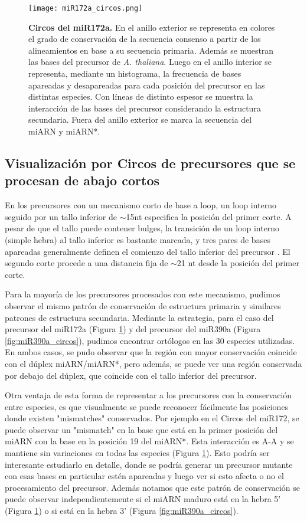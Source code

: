 \begin{figure}[htbp!] 
    \centering    
    \texttt{[image: miR172a\_circos.png]}
    \caption[Circos del miR172a]{
    \textbf{Circos del miR172a.}
En el anillo exterior se representa en colores el grado de conservación de la secuencia consenso a partir de los alineamientos en base a su secuencia primaria.
Además se muestran las bases del precursor de \textit {A. thaliana}.
Luego en el anillo interior se representa, mediante un histograma, la frecuencia de bases apareadas y desapareadas para cada posición del precursor en las distintas especies.
Con líneas de distinto espesor se muestra la interacción de las bases del precursor considerando la estructura secundaria. 
Fuera del anillo exterior se marca la secuencia del miARN y miARN*.
   }
     \label{fig:miR172a_circos}
\end{figure}


\subsection{Visualización por Circos de precursores que se procesan de abajo cortos}

En los precursores con un mecanismo corto de base a loop, un loop interno seguido por un tallo inferior de $\sim$15nt especifica la posición del primer corte.
A pesar de que el tallo puede contener bulges, la transición de un loop interno (simple hebra) al tallo inferior es bastante marcada, y tres pares de bases apareadas generalmente definen el comienzo del tallo inferior del precursor \citep{Mateos2010,Bologna2013}.
El segundo corte procede a una distancia fija de $\sim$21 nt desde la posición del primer corte.

Para la mayoría de los precursores procesados con este mecanismo, pudimos observar el mismo patrón de conservación de estructura primaria y similares patrones de estructura secundaria.
Mediante la estrategia, para el caso del precursor del miR172a (Figura \ref{fig:miR172a_circos}) y del precursor del miR390a (Figura \ref{fig:miR390a_circos}), pudimos encontrar ortólogos en las 30 especies utilizadas.
En ambos casos, se pudo observar que la región con mayor conservación coincide con el dúplex miARN/miARN*, pero además, se puede ver una región conservada por debajo del dúplex, que coincide con el tallo inferior del precursor.

Otra ventaja de esta forma de representar a los precursores con la conservación entre especies, es que visualmente se puede reconocer fácilmente las posiciones donde existen "mismatches" conservados. 
Por ejemplo en el Circos del miR172, se puede observar un "mismatch" en la base que está en la primer posición del miARN con la base en la posición 19 del miARN*.
Esta interacción es A-A y se mantiene sin variaciones en todas las especies (Figura \ref{fig:miR172a_circos}).
Esto podría ser interesante estudiarlo en detalle, donde se podría generar un precursor mutante con esas bases en particular estén apareadas y luego ver si esto afecta o no el procesamiento del precursor.  
Además notamos que este patrón de conservación se puede observar independientemente si el miARN maduro está en la hebra 5' (Figura \ref{fig:miR172a_circos}) o si está en la hebra 3' (Figura \ref{fig:miR390a_circos}).



